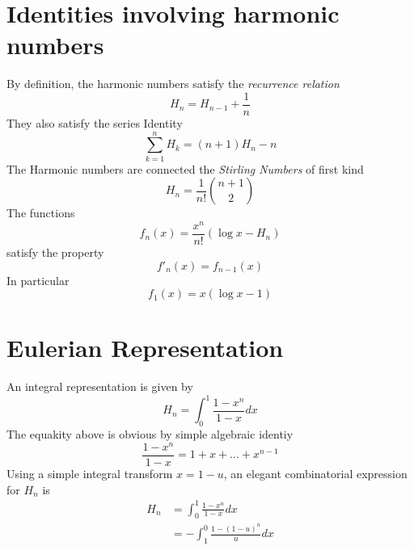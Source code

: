 \documentclass{article}
\begin{document}
\section{Identities involving harmonic numbers}
By definition, the harmonic numbers satisfy the \emph{recurrence relation}
\begin{equation} 
H_{n}=H_{n-1}+\frac{1}{n} \label{recurrence relation}
\end{equation}
They also satisfy the series Identity
\begin{equation}
\sum_{k=1}^n H_{k} = (n+1) H_{n} - n \label{Series Identity}
\end{equation}
The Harmonic numbers are connected the \emph{Stirling Numbers} of first kind
\begin{equation}
H_{n} = \frac{1}{n!} {n+1 \choose 2} \label{Stirling Identity}
\end{equation}
The functions
\begin{equation}
f_{n} (x) = \frac{x^n}{n!} (\log{x}-H_{n})
\end{equation}
satisfy the property
\begin{equation}
{f'}_{n} (x) = f_{n-1} (x)
\end{equation}
In particular
\begin{equation}
f_{1} (x) = x(\log{x}-1)       			
\end{equation}
\section{Eulerian Representation}
An integral representation is given by
\begin{equation}
H_{n} = \int_{0}^{1} \frac{1-x^n}{1-x} dx \label{Euler equation}
\end{equation}
The equakity above is obvious by simple algebraic identiy
\begin{equation}
\frac{1-x^n}{1-x} = 1+x+...+x^{n-1}
\end{equation}
Using a simple integral transform ${x = 1-u}$, an elegant combinatorial expression for $H_{n}$ is
\begin{align}
H_{n} &= \int_{0}^{1} \frac{1-x^n}{1-x} dx \\
	 &= -\int_{1}^{0} \frac{1-{(1-u)}^n}{u} dx
\end{align}
\end{document}
